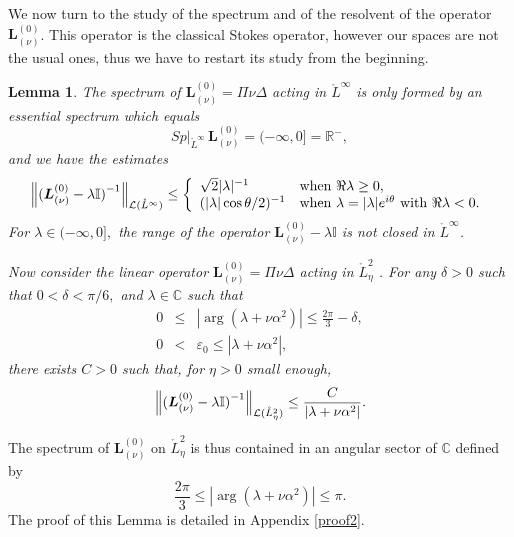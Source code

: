 \documentclass[11pt]{article}
\newtheorem{lemma}[theorem]{Lemma}
\begin{document}
We now turn to the study of the spectrum and of the resolvent of the operator $\boldsymbol{L}^{(0)}_{(\nu)}$.
This operator is the classical Stokes operator, however our spaces
are not the usual ones, thus we have to restart its study from the beginning.

\begin{lemma} \label{lemma3}
\label{lem:spectrumL0 expky}The spectrum of $\boldsymbol{L}_{(\nu
)}^{(0)}=\Pi \nu \Delta  $ acting in $\mathring{L}^{\infty }$ is only
formed by an essential spectrum which equals 
\begin{equation*}
Sp|_{\mathring{L}^{\infty }} \, \boldsymbol{L}_{(\nu )}^{(0)}=(-\infty ,0]=%
\mathbb{R}^{-},
\end{equation*}%
and we have the estimates
\begin{equation*}
\Bigl\|(\boldsymbol{L}_{(\nu )}^{(0)}-\lambda \mathbb{I)}^{-1} \Bigr\|_{\mathcal{L}(%
\mathring{L}^{\infty })}\leq \left\{ 
\begin{array}{ll}
\sqrt{2}|\lambda |^{-1} & \text{when }\Re \lambda \geq 0, \\ 
(|\lambda |\cos \theta /2)^{-1} & \text{when }\lambda =|\lambda |e^{i\theta
} \text{ with } \Re \lambda <0.%
\end{array}%
\right.
\end{equation*}%
For $\lambda \in (-\infty ,0],$ the range of the operator $\boldsymbol{L}%
_{(\nu )}^{(0)}-\lambda \mathbb{I}$ is not closed in $\mathring{L}%
^{\infty }$.

Now consider the linear operator $\boldsymbol{L}_{(\nu )}^{(0)}=\Pi \nu
\Delta$ acting in $\mathring{L}_{\eta}^{2}$ . For any $\delta >0$ such
that $0<\delta <\pi /6,$ and $\lambda \in \mathbb{C}$ such that 
\begin{eqnarray*}
0 &\leq &|\arg (\lambda +\nu \alpha ^{2})|\leq \frac{ 2\pi}{3} - \delta , \\
0 &< &  \varepsilon_0 \le |\lambda +\nu \alpha ^{2}|,
\end{eqnarray*}%
there exists $C>0$ such that, for $\eta>0$ small enough,%
\begin{equation}
\Bigl\|(\boldsymbol{L}_{(\nu)}^{(0)}-\lambda \mathbb{I)}^{-1} \Bigr\|_{\mathcal{L}(%
\mathring{L}_{\eta}^{2})}\leq \frac{C}{|\lambda +\nu \alpha ^{2}|}.
\label{estimresol1zero}
\end{equation}
\end{lemma}

The spectrum of $\boldsymbol{L}_{(\nu )}^{(0)}$
on ${\mathring{L}_{\eta}^{2}}$ is
thus contained in an angular sector of $\mathbb{C}$ defined by%
\begin{equation*}
\frac{2\pi}{3}\leq |\arg (\lambda +\nu \alpha ^{2})|\leq \pi .
\end{equation*}%
The proof of this Lemma is detailed in Appendix \ref{proof2}.
\end{document}
